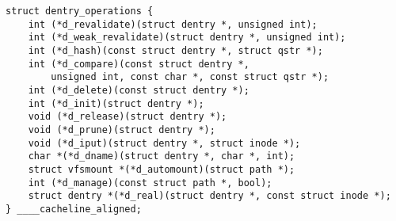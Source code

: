 
\begin{lstlisting}
struct dentry_operations {
    int (*d_revalidate)(struct dentry *, unsigned int);
    int (*d_weak_revalidate)(struct dentry *, unsigned int);
    int (*d_hash)(const struct dentry *, struct qstr *);
    int (*d_compare)(const struct dentry *,
        unsigned int, const char *, const struct qstr *);
    int (*d_delete)(const struct dentry *);
    int (*d_init)(struct dentry *);
    void (*d_release)(struct dentry *);
    void (*d_prune)(struct dentry *);
    void (*d_iput)(struct dentry *, struct inode *);
    char *(*d_dname)(struct dentry *, char *, int);
    struct vfsmount *(*d_automount)(struct path *);
    int (*d_manage)(const struct path *, bool);
    struct dentry *(*d_real)(struct dentry *, const struct inode *);
} ____cacheline_aligned;
\end{lstlisting}
